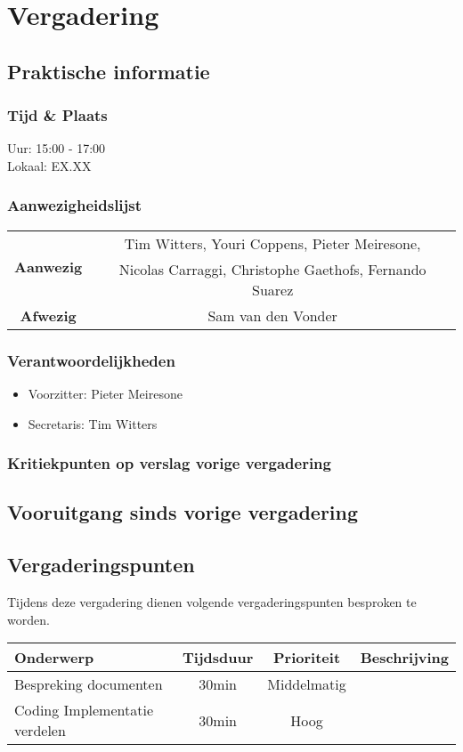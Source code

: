 \section{Vergadering \MeetingDate}
\subsection{Praktische informatie}
\subsubsection{Tijd \& Plaats}
Uur: 15:00 - 17:00
\\
Lokaal: EX.XX
\subsubsection{Aanwezigheidslijst}
\begin{table}[htbp]
	\centering
	\begin{tabular}{c|c}
		\multirow{2}{*}{\textbf{Aanwezig}} & Tim Witters, Youri Coppens, Pieter Meiresone, \\
		& Nicolas Carraggi,  Christophe Gaethofs, Fernando Suarez\\
		\hline
		\textbf{Afwezig} & Sam van den Vonder \\
	\end{tabular}
\end{table}

\subsubsection{Verantwoordelijkheden}
\begin{itemize}
	\item Voorzitter: Pieter Meiresone
	\item Secretaris: Tim Witters
\end{itemize}

\subsubsection{Kritiekpunten op verslag vorige vergadering}

\subsection{Vooruitgang sinds vorige vergadering}

\subsection{Vergaderingspunten}
Tijdens deze vergadering dienen volgende vergaderingspunten besproken te worden.
\begin{table} [H]
	\centering
	\begin{tabular} {l|c|c|c}
		Onderwerp & Tijdsduur & Prioriteit & Beschrijving \\ %
		\hline
		Bespreking documenten & 30min & Middelmatig &  \\
		Coding Implementatie verdelen & 30min & Hoog & \\
	\end{tabular}
\end{table}

